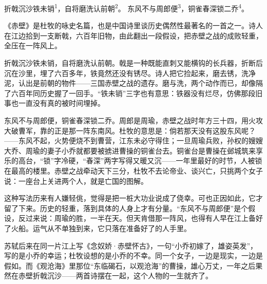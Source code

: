 
\begin{poem}
折戟沉沙铁未销\textsuperscript{1}，自将磨洗认前朝\textsuperscript{2}。
东风不与周郎便\textsuperscript{3}，铜雀春深锁二乔\textsuperscript{4}。
\end{poem}

\begin{annotations}
\end{annotations}

\begin{appreciation}
《赤壁》是杜牧的咏史名篇，也是中国诗里谈历史偶然性最著名的一首之一。诗人在江边拾到一支断戟，六百年旧物，由此翻出一段假设，把赤壁之战的成败轻重，全压在一阵风上。

折戟沉沙铁未销，自将磨洗认前朝。戟是一种既能直刺又能横钩的长兵器，折断后沉在沙里，埋了六百多年，铁竟然还没有锈尽。诗人把它捡起来，磨去锈，洗净泥，认出是前朝的物件——三国赤壁之战的遗存。磨与洗，两个动作而已，却像隔了六百年同历史握了一回手。“铁未销”三字也有意思：铁器没有烂尽，仿佛那段旧事也一直没有真的被时间埋掉。

东风不与周郎便，铜雀春深锁二乔。周郎是周瑜，赤壁之战时年方三十四，用火攻大破曹军，靠的正是那一阵东南风。杜牧的意思是：倘若那天没有这股东风呢？——东风不起，火势便烧不到曹营，江东未必守得住；一旦周瑜兵败，孙权的嫂嫂大乔、周瑜的妻子小乔就都要被掳进曹操的铜雀台去。铜雀台是曹操在邺城筑来享乐的高台，“锁”字冷硬，“春深”两字写得又暖又沉——一年里最好的时节，人被锁在最高的楼里。赤壁之战牵动天下三分，杜牧不去论帝业、谈兴亡，只挑两个女子说：一座台上关进两个人，就是亡国的图解。

这种写法历来有人嫌轻佻，觉得是把一桩大功业说成了侥幸。可也正因如此，它才留了下来。历史的轻重，落到具体的人身上才有分量。“东风不与周郎便”是个假设，反过来说：周瑜的胜，一半在天。但天肯借那一阵风，也得有人早在江上备好了火船。运气从不单独到来，它只落在准备好了的人手里。

苏轼后来在同一片江上写《念奴娇·赤壁怀古》，一句“小乔初嫁了，雄姿英发”，写的是小乔的幸运；杜牧设想的是小乔的不幸。同一个女子，一边是现实，一边是假如。而《观沧海》里那位“东临碣石，以观沧海”的曹操，雄心万丈，一年之后果然在赤壁折戟沉沙——两首诗摆在一起，这个人物的一生就齐了。
\end{appreciation}
